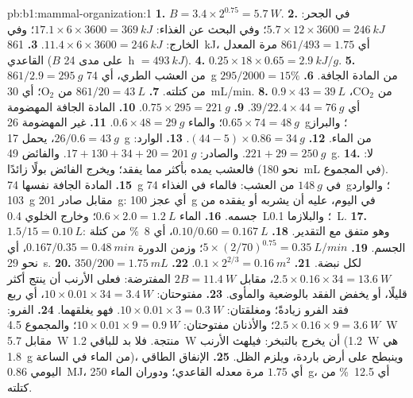 \begin{solution}{pb:b1:mammal-organization:1}
\textbf{1.} $B = 3.4\times 2^{0.75} = \qty{5.7}{W}$.
\textbf{2.} في الجحر: $5.7\times 12\times 3600 = \qty{246}{kJ}$؛ وفي
البحث عن الغذاء: $17.1\times 6\times 3600 = \qty{369}{kJ}$؛ وفي
الخارج: $11.4\times 6\times 3600 = \qty{246}{kJ}$.
\textbf{3.} \qty{861}{kJ}، أي $861/493 = 1.75$ مرة المعدل القاعدي
($B$ على مدى \qty{24}{h} $= \qty{493}{kJ}$).
\textbf{4.} $0.25\times 18\times 0.65 = \qty{2.9}{kJ/g}$.
\textbf{5.} $861/2.9 = \qty{295}{g}$ من العشب الطري، أي \qty{74}{g}
من المادة الجافة.
\textbf{6.} $295/2000 = 15\%$ من كتلته.
\textbf{7.} $861/20 = \qty{43}{L}$ من $\mathrm{O_2}$؛ أي
\qty{30}{mL/min}.
\textbf{8.} $0.9\times 43 = \qty{39}{L}$ من $\mathrm{CO_2}$، أي $39/22.4\times 44 = \qty{76}{g}$.
\textbf{9.} $0.75\times 295 = \qty{221}{g}$.
\textbf{10.} المادة الجافة المهضومة $0.65\times 74 = \qty{48}{g}$؛
والماء $0.6\times 48 = \qty{29}{g}$.
\textbf{11.} غير المهضومة \qty{26}{g}؛ والبراز
$26/0.6 = \qty{43}{g}$، يحمل \qty{17}{g} من الماء.
\textbf{12.} $(44 - 5)\times 0.86 = \qty{34}{g}$.
\textbf{13.} الوارد: $221 + 29 = \qty{250}{g}$. والصادر:
$17 + 130 + 34 + 20
= \qty{201}{g}$. والفائض \qty{49}{g}.
\textbf{14.} لا: فالعشب يمده بأكثر مما يفقد؛ ويخرج الفائض بولًا
زائدًا (نحو \qty{180}{mL} في المجموع).
\textbf{15.} المادة الجافة نفسها \qty{74}{g} في $\qty{148}{g}$ من
العشب: فالماء في الغذاء \qty{74}{g}؛ والوارد \qty{103}{g} مقابل صادر
\qty{201}{g}: أي عجز \qty{100}{g} في اليوم، عليه أن يشربه أو يفقده
من جسمه.
\textbf{16.} الماء $0.6\times 2.0 = \qty{1.2}{L}$؛ وخارج الخلوي
\qty{0.4}{L}؛ والبلازما \qty{0.1}{L}.
\textbf{17.} $1.5/15 = \qty{0.10}{L}$: وهو متفق مع التقدير.
\textbf{18.} $0.10/0.60 = \qty{0.167}{L}$، أي \qty{8}{\%} من كتلة
الجسم.
\textbf{19.} $5\times(2/70)^{0.75} = \qty{0.35}{L/min}$؛ وزمن الدورة
$0.167/0.35 = \qty{0.48}{min}$، أي نحو \qty{29}{s}.
\textbf{20.} $350/200 = \qty{1.75}{mL}$ لكل نبضة.
\textbf{21.} $0.1\times 2^{2/3} = \qty{0.16}{m^2}$.
\textbf{22.} $2.5\times 0.16\times 34 = \qty{13.6}{W}$، مقابل
$2B = \qty{11.4}{W}$ المفترضة: فعلى الأرنب أن ينتج أكثر قليلًا، أو
يخفض الفقد بالوضعية والمأوى.
\textbf{23.} مفتوحتان: $10\times 0.01\times 34 = \qty{3.4}{W}$، أي
ربع فقد الفرو زيادةً؛ ومغلقتان:
$10\times 0.01\times 3 =
\qty{0.3}{W}$. فهو يغلقهما.
\textbf{24.} الفرو: $2.5\times 0.16\times 9 = \qty{3.6}{W}$؛
والأذنان مفتوحتان: $10\times 0.01\times 9 = \qty{0.9}{W}$؛
والمجموع \qty{4.5}{W} مقابل \qty{5.7}{W} منتجة. فلا بد للباقي
\qty{1.2}{W} أن يخرج بالتبخر: فيلهث الأرنب (\qty{1.2}{W} هي
\qty{1.8}{g} من الماء في الساعة)، وينبطح على أرض باردة، ويلزم الظل.
\textbf{25.} الإنفاق الطاقي اليومي \qty{0.86}{MJ}، أي $1.75$ مرة
معدله القاعدي؛ ودوران الماء \qty{250}{g}، أي \qty{12.5}{\%} من
كتلته.
\end{solution}
